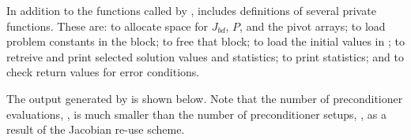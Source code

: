 In addition to the functions called by {\cvode},  includes
definitions of several private functions.  These are: 
to allocate space for $J_{bd}$, $P$, and the pivot arrays; 
to load problem constants in the  block;  to free
that block;  to load the initial values in ; 
 to retreive and print selected solution values and
statistics;  to print statistics; and 
to check return values for error conditions.

The output generated by  is shown below.  Note that the
number of preconditioner evaluations, , is much smaller than
the number of preconditioner setups, , as a result of the
Jacobian re-use scheme.


